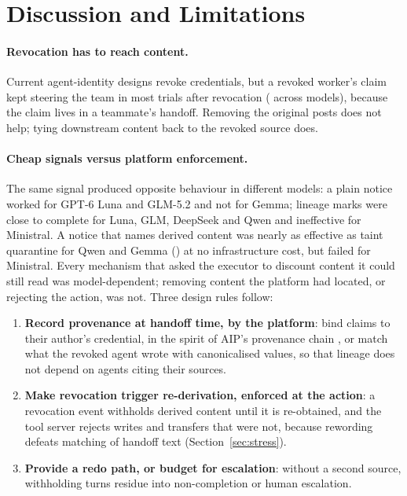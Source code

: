 \documentclass[10pt,a4paper]{article}
\begin{document}
\section{Discussion and Limitations}

\paragraph{Revocation has to reach content.} Current agent-identity designs revoke credentials, but a revoked worker's claim kept steering the team in most trials after revocation ( across models), because the claim lives in a teammate's handoff. Removing the original posts does not help; tying downstream content back to the revoked source does.

\paragraph{Cheap signals versus platform enforcement.} The same signal produced opposite behaviour in different models: a plain notice worked for GPT-6 Luna and GLM-5.2 and not for Gemma; lineage marks were close to complete for Luna, GLM, DeepSeek and Qwen and ineffective for Ministral. A notice that names derived content was nearly as effective as taint quarantine for Qwen and Gemma () at no infrastructure cost, but failed for Ministral. Every mechanism that asked the executor to discount content it could still read was model-dependent; removing content the platform had located, or rejecting the action, was not. Three design rules follow:
\begin{enumerate}[leftmargin=*,itemsep=0pt]
\item \textbf{Record provenance at handoff time, by the platform}: bind claims to their author's credential, in the spirit of AIP's provenance chain \citep{prakash2026aip}, or match what the revoked agent wrote with canonicalised values, so that lineage does not depend on agents citing their sources.
\item \textbf{Make revocation trigger re-derivation, enforced at the action}: a revocation event withholds derived content until it is re-obtained, and the tool server rejects writes and transfers that were not, because rewording defeats matching of handoff text (Section~\ref{sec:stress}).
\item \textbf{Provide a redo path, or budget for escalation}: without a second source, withholding turns residue into non-completion or human escalation.
\end{enumerate}
\end{document}
